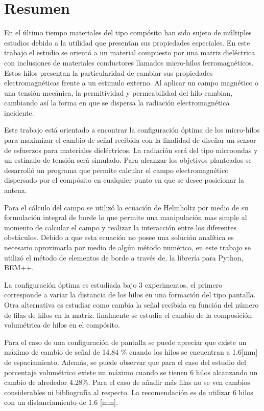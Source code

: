 \documentclass[12pt,letterpaper]{article}
\numberwithin{equation}{section}
\begin{document}
\pagebreak
\section*{Resumen}
En el último tiempo materiales del tipo compósito han sido sujeto de múltiples estudios debido a la utilidad que presentan sus propiedades especiales. En este trabajo el estudio se orientó a un material compuesto por una matriz dieléctrica con inclusiones de materiales conductores llamados micro-hilos ferromagnéticos. Estos hilos presentan la particularidad de cambiar sus propiedades electromagnéticas frente a un estimulo externo. Al aplicar un campo magnético o una tensión mecánica, la permitividad y permeabilidad del hilo cambian, cambiando así la forma en que se dispersa la radiación electromagnética incidente.

Este trabajo está orientado a encontrar la configuración óptima de los micro-hilos para maximizar el cambio de señal recibida con la finalidad de diseñar un sensor de esfuerzos para materiales dieléctricos. La radiación será del tipo microondas y un estimulo de tensión será simulado. Para alcanzar los objetivos planteados se desarrolló un programa que permite calcular el campo electromagnético dispersado por el compósito en cualquier punto en que se desee posicionar la antena.

Para el cálculo del campo se utilizó la ecuación de Helmholtz por medio de su formulación integral de borde lo que permite una manipulación mas simple al momento de calcular el campo y realizar la interacción entre los diferentes obstáculos. Debido a que esta ecuación no posee una solución analítica es necesario aproximarla por medio de algún método numérico, en este trabajo se utilizó el método de elementos de borde a través de, la librería para Python, BEM++.

La configuración óptima es estudiada bajo 3 experimentos, el primero corresponde a variar la distancia de los hilos en una formación del tipo pantalla. Otra alternativa es estudiar como cambia la señal recibida en función del número de filas de hilos en la matriz. finalmente se estudia el cambio de la composición volumétrica de hilos en el compósito.

Para el caso de una configuración de pantalla se puede apreciar que existe un máximo de cambio de señal de 14.84 \% cuando los hilos se encuentran a 1.6[mm] de espaciamiento. Además, se puede observar que para el caso del estudio del porcentaje volumétrico existe un máximo cuando se tienen 6 hilos alcanzando un cambio de alrededor 4.28\%. Para el caso de añadir más filas no se ven cambios considerables ni bibliografía al respecto. La recomendación es de utilizar 6 hilos con un distanciamiento de 1.6 [mm].\\
\end{document}
